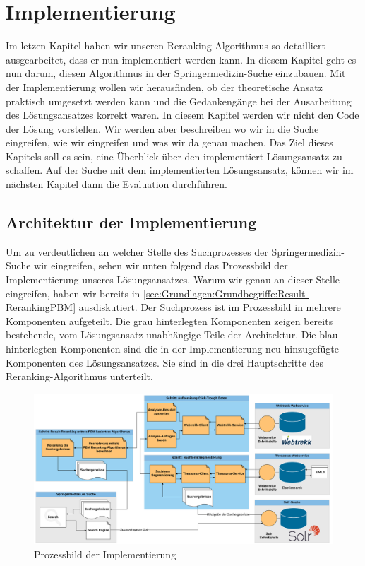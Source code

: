 %
\chapter{Implementierung}
\label{sec:Implementierung}

Im letzen Kapitel haben wir unseren Reranking-Algorithmus so detailliert ausgearbeitet, dass er nun implementiert werden kann. In diesem Kapitel geht es nun darum, diesen Algorithmus in der Springermedizin-Suche einzubauen. Mit der Implementierung wollen wir herausfinden, ob der theoretische Ansatz praktisch umgesetzt werden kann und die Gedankengänge bei der Ausarbeitung des Lösungsansatzes korrekt waren. In diesem Kapitel werden wir nicht den Code der Lösung vorstellen. Wir werden aber beschreiben wo wir in die Suche eingreifen, wie wir eingreifen und was wir da genau machen. Das Ziel dieses Kapitels soll es sein, eine Überblick über den implementiert Lösungsansatz zu schaffen. Auf  der Suche mit dem implementierten Lösungsansatz, können wir im nächsten Kapitel dann die Evaluation durchführen.

\section{Architektur der Implementierung}
\label{sec:Implementierung:Architektur}

Um zu verdeutlichen an welcher Stelle des Suchprozesses der Springermedizin-Suche wir eingreifen, sehen wir unten folgend das Prozessbild der Implementierung unseres Lösungsansatzes. Warum wir genau an dieser Stelle eingreifen, haben wir bereits in \ref{sec:Grundlagen:Grundbegriffe:Result-RerankingPBM} ausdiskutiert. Der Suchprozess ist im Prozessbild in mehrere Komponenten aufgeteilt. Die grau hinterlegten Komponenten zeigen bereits bestehende, vom Lösungsansatz unabhängige Teile der Architektur. Die blau hinterlegten Komponenten sind die in der Implementierung neu hinzugefügte Komponenten des Lösungsansatzes. Sie sind in die drei Hauptschritte des Reranking-Algorithmus unterteilt.

\begin{figure}[H]
\centering
\vspace{-1em}
\caption[Prozessbild der Implementierung]{Prozessbild der Implementierung}
\label{fig:ProzessbildImplementierung}
\includegraphics[width=\linewidth]{gfx/ImplementierungProzessbild}
\vspace{-2.5em}
\end{figure}

